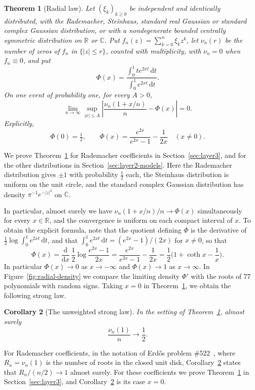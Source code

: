 \documentclass[12pt,leqno,twoside]{article}
\newcommand{\dd}{\,\mathrm d}
\newcommand{\C}{\mathbb C}
\newtheorem{theorem}{Theorem}[section]
\newtheorem{corollary}[theorem]{Corollary}
\theoremstyle{named}
\theoremstyle{remark}
\begin{document}
\begin{theorem}[Radial law]\label{thm:radial-profile}
Let $(\xi_k)_{k\ge0}$ be independent and identically distributed, with
the Rademacher, Steinhaus, standard real Gaussian or standard complex
Gaussian distribution, or with a nondegenerate bounded centrally
symmetric distribution on $\mathbb R$ or $\mathbb C$. Put
$f_n(z)=\sum_{k=0}^n\xi_kz^k$, let $\nu_n(r)$ be the number of zeros of
$f_n$ in $\{|z|\le r\}$, counted with multiplicity, with $\nu_n=0$ when
$f_n\equiv0$, and put
\[
 \Phi(x)=\frac{\int_0^1t e^{2xt}\dd t}
                   {\int_0^1e^{2xt}\dd t}.
\]
On one event of probability one, for every $A>0$,
\[
 \lim_{n\to\infty}\sup_{|x|\le A}
 \left|\frac{\nu_n(1+x/n)}n-\Phi(x)\right|=0.
\]
Explicitly,
\[
 \Phi(0)=\tfrac12,\qquad
 \Phi(x)=\frac{e^{2x}}{e^{2x}-1}-\frac1{2x}\quad(x\ne0).
\]
\end{theorem}
\afterpage{}

We prove Theorem~\ref{thm:radial-profile} for Rademacher coefficients in
Section~\ref{sec:layer3}, and for the other distributions in
Section~\ref{sec:layer2-models}.
Here the Rademacher distribution gives $\pm1$ with probability $\frac12$
each, the Steinhaus distribution is uniform on the unit circle, and the
standard complex Gaussian distribution has density $\pi^{-1}e^{-|z|^2}$
on $\C$.

In particular, almost surely we have $\nu_n(1+x/n)/n\to\Phi(x)$
simultaneously for every $x\in\mathbb R$, and the convergence is uniform
on each compact interval of $x$.
To obtain the explicit formula, note that the quotient defining $\Phi$
is the derivative of $\frac12\log\int_0^1e^{2xt}\dd t$, and that
$\int_0^1e^{2xt}\dd t=(e^{2x}-1)/(2x)$ for $x\ne0$, so that
\[
 \Phi(x)=\frac{\mathrm d}{\mathrm dx}\,\frac12\log\frac{e^{2x}-1}{2x}
 =\frac{e^{2x}}{e^{2x}-1}-\frac1{2x}
 =\frac12\Big(1+\coth x-\frac1x\Big).
\]
In particular $\Phi(x)\to0$ as $x\to-\infty$ and $\Phi(x)\to1$ as
$x\to\infty$.
In Figure~\ref{fig:radial-density} we compare the limiting density
$\Phi'$ with the roots of 77 polynomials with random signs.
Taking $x=0$ in Theorem~\ref{thm:radial-profile}, we obtain the following
strong law.

\begin{corollary}[The unweighted strong law]\label{thm:stronglaw}
In the setting of Theorem~\ref{thm:radial-profile}, almost surely
\[
 \frac{\nu_n(1)}n\longrightarrow\frac12.
\]
\end{corollary}

For Rademacher coefficients, in the notation of Erd\H{o}s problem
\#522~\cite{Erdos522Problem}, where $R_n=\nu_n(1)$ is the number of roots
in the closed unit disk, Corollary~\ref{thm:stronglaw} states that
$R_n/(n/2)\to1$ almost surely.
For these coefficients we prove Theorem~\ref{thm:radial-profile} in
Section~\ref{sec:layer3}, and Corollary~\ref{thm:stronglaw} is its case
$x=0$.
\end{document}
